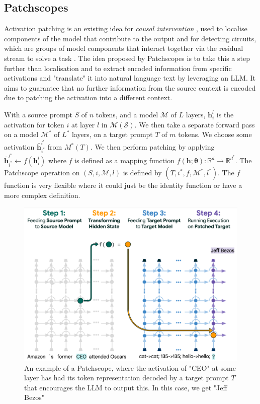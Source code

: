 \newpage

\subsection{Patchscopes}
Activation patching is an existing idea for \textit{causal intervention} \cite{geiger_causal_2021}, used to localise components of the model that contribute to the output \cite{stolfo_mechanistic_2023} and for detecting circuits, which are groups of model components that interact together via the residual stream to solve a task \cite{wang_interpretability_2023, cammarata_thread_2020}. The idea proposed by Patchscopes \cite{ghandeharioun_patchscopes_2024} is to take this a step further than localisation and to extract encoded information from specific activations and "translate" it into natural language text by leveraging an LLM. It aims to guarantee that no further information from the source context is encoded due to patching the activation into a different context.

With a source prompt $S$ of $n$ tokens, and a model $\mathcal{M}$ of $L$ layers, $\bm{h}_i^l$ is the activation for token $i$ at layer $l$ in $\mathcal{M(S)}$. We then take a separate forward pass on a model $\mathcal{M^*}$ of $L^*$ layers, on a target prompt $T$ of $m$ tokens. We choose some activation $\bar{\bm{h}}_{i^*}^{l^*}$ from $M^*(T)$. We then perform patching by applying $\bar{\bm{h}}_{i^*}^{l^*} \xleftarrow{} f(\bm{h}_i^l)$ where $f$ is defined as a mapping function $f(\bm{h};\bm{\theta}):\mathbb{R}^d \xrightarrow{} \mathbb{R}^{d^*}$. The Patchscope operation on $(S, i, \mathcal{M}, l)$ is defined by $(T,i^*,f,\mathcal{M}^*,l^*)$. The $f$ function is very flexible where it could just be the identity function or have a more complex definition.

\begin{figure}[h]
    \centering
    \includegraphics[width=0.95\linewidth]{patchscopes.png}
    \caption{An example of a Patchscope, where the activation of "CEO" at some layer has had its token representation decoded by a target prompt $T$ that encourages the LLM to output this. In this case, we get "Jeff Bezos" \cite{ghandeharioun_patchscopes_2024}}
    \label{fig:enter-label}
\end{figure}

